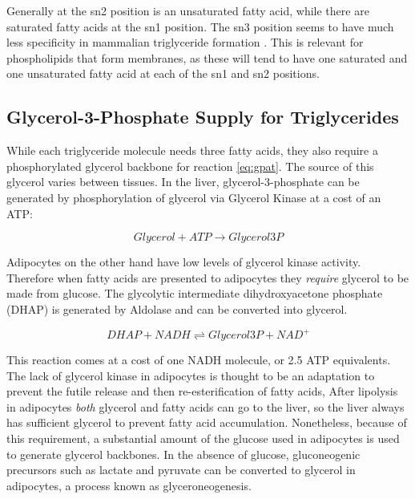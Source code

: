 \documentclass{tufte-handout}
\begin{document}
  Generally at the sn2 position is an unsaturated fatty acid, while there are saturated fatty acids at the sn1 position.  The sn3 position seems to have much less specificity in mammalian triglyceride formation \citep{Brockerhoff1971}.  This is relevant for phospholipids that form membranes, as these will tend to have one saturated and one unsaturated fatty acid at each of the sn1 and sn2 positions.  

\subsection{Glycerol-3-Phosphate Supply for Triglycerides}

While each triglyceride molecule needs three fatty acids, they also require a phosphorylated glycerol backbone for reaction \ref{eq:gpat}.  The source of this glycerol varies between tissues.  In the liver, glycerol-3-phosphate can be generated by phosphorylation of glycerol via Glycerol Kinase at a cost of an ATP:

\begin{equation}
Glycerol + ATP \rightarrow Glycerol3P
\end{equation}

Adipocytes on the other hand have low levels of glycerol kinase activity.  Therefore when fatty acids are presented to adipocytes they \emph{require} glycerol to be made from glucose.  The glycolytic intermediate dihydroxyacetone phosphate (DHAP) is generated by Aldolase and can be converted into glycerol.

\begin{equation}\label{eq:g3pdh}
DHAP + NADH \rightleftharpoons Glycerol3P + NAD^+
\end{equation}

This reaction comes at a cost of one NADH molecule, or 2.5 ATP equivalents.  The lack of glycerol kinase in adipocytes is thought to be an adaptation to prevent the futile release and then re-esterification of fatty acids,  After lipolysis in adipocytes \emph{both} glycerol and fatty acids can go to the liver, so the liver always has sufficient glycerol to prevent fatty acid accumulation.  Nonetheless, because of this requirement, a substantial amount of the glucose used in adipocytes is used to generate glycerol backbones.  In the absence of glucose, gluconeogenic precursors such as lactate and pyruvate can be converted to glycerol in adipocytes, a process known as glyceroneogenesis.
\end{document}
